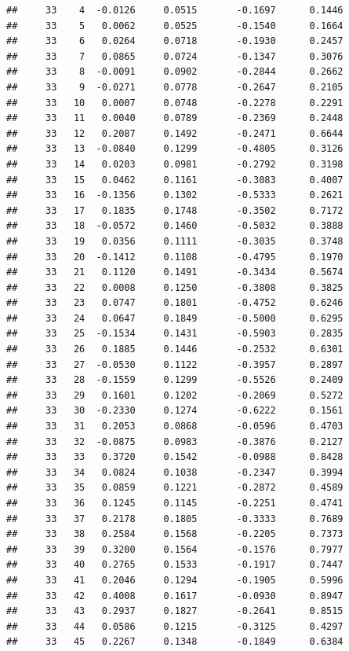 \documentclass[
]{article}
\begin{document}
\begin{verbatim}
##     33    4  -0.0126     0.0515       -0.1697      0.1446  
##     33    5   0.0062     0.0525       -0.1540      0.1664  
##     33    6   0.0264     0.0718       -0.1930      0.2457  
##     33    7   0.0865     0.0724       -0.1347      0.3076  
##     33    8  -0.0091     0.0902       -0.2844      0.2662  
##     33    9  -0.0271     0.0778       -0.2647      0.2105  
##     33   10   0.0007     0.0748       -0.2278      0.2291  
##     33   11   0.0040     0.0789       -0.2369      0.2448  
##     33   12   0.2087     0.1492       -0.2471      0.6644  
##     33   13  -0.0840     0.1299       -0.4805      0.3126  
##     33   14   0.0203     0.0981       -0.2792      0.3198  
##     33   15   0.0462     0.1161       -0.3083      0.4007  
##     33   16  -0.1356     0.1302       -0.5333      0.2621  
##     33   17   0.1835     0.1748       -0.3502      0.7172  
##     33   18  -0.0572     0.1460       -0.5032      0.3888  
##     33   19   0.0356     0.1111       -0.3035      0.3748  
##     33   20  -0.1412     0.1108       -0.4795      0.1970  
##     33   21   0.1120     0.1491       -0.3434      0.5674  
##     33   22   0.0008     0.1250       -0.3808      0.3825  
##     33   23   0.0747     0.1801       -0.4752      0.6246  
##     33   24   0.0647     0.1849       -0.5000      0.6295  
##     33   25  -0.1534     0.1431       -0.5903      0.2835  
##     33   26   0.1885     0.1446       -0.2532      0.6301  
##     33   27  -0.0530     0.1122       -0.3957      0.2897  
##     33   28  -0.1559     0.1299       -0.5526      0.2409  
##     33   29   0.1601     0.1202       -0.2069      0.5272  
##     33   30  -0.2330     0.1274       -0.6222      0.1561  
##     33   31   0.2053     0.0868       -0.0596      0.4703  
##     33   32  -0.0875     0.0983       -0.3876      0.2127  
##     33   33   0.3720     0.1542       -0.0988      0.8428  
##     33   34   0.0824     0.1038       -0.2347      0.3994  
##     33   35   0.0859     0.1221       -0.2872      0.4589  
##     33   36   0.1245     0.1145       -0.2251      0.4741  
##     33   37   0.2178     0.1805       -0.3333      0.7689  
##     33   38   0.2584     0.1568       -0.2205      0.7373  
##     33   39   0.3200     0.1564       -0.1576      0.7977  
##     33   40   0.2765     0.1533       -0.1917      0.7447  
##     33   41   0.2046     0.1294       -0.1905      0.5996  
##     33   42   0.4008     0.1617       -0.0930      0.8947  
##     33   43   0.2937     0.1827       -0.2641      0.8515  
##     33   44   0.0586     0.1215       -0.3125      0.4297  
##     33   45   0.2267     0.1348       -0.1849      0.6384  

\end{verbatim}
\end{document}
